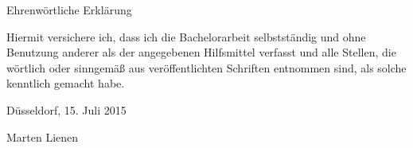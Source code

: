 \documentclass[11pt,a4paper]{book}
\begin{document}
\printbibliography

\pagestyle{empty}
\cleardoublepage

\vspace*{10em}
{\LARGE Ehrenwörtliche Erklärung}
\vspace{1em}

Hiermit versichere ich, dass ich die Bachelorarbeit selbstständig und ohne
Benutzung anderer als der angegebenen Hilfsmittel verfasst und alle Stellen, die
wörtlich oder sinngemäß aus veröffentlichten Schriften entnommen sind, als
solche kenntlich gemacht habe.

\vspace{5em}

\begin{minipage}{0.4\textwidth}
  \begin{flushleft}
    Düsseldorf, 15. Juli 2015
  \end{flushleft}
\end{minipage}
\hfill
\begin{minipage}{0.4\textwidth}
  \begin{flushright}
    Marten Lienen
  \end{flushright}
\end{minipage}
\end{document}
